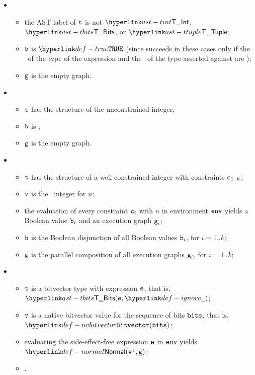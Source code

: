 \OneApplies
\begin{itemize}
  \item {}
  \begin{itemize}
    \item the AST label of $\texttt{t}$ is not $\TInt$, $\TBits$, or $\TTuple$;
    \item $\texttt{b}$ is $\True$ (since 
    succeeds in these cases only if the \structure\ of the type of the expression and the \structure\ of the type asserted against are \typeequivalent);
    \item $\texttt{g}$ is the empty graph.
  \end{itemize}

  \item {}
  \begin{itemize}
    \item $\texttt{t}$ has the structure of the unconstrained integer;
    \item $\texttt{b}$ is \True;
    \item $\texttt{g}$ is the empty graph.
  \end{itemize}

  \item {}
  \begin{itemize}
    \item $\texttt{t}$ has the structure of a well-constrained integer with constraints $\texttt{c}_{1..k}$;
    \item $\texttt{v}$ is the \nativevalue\  integer for $n$;
    \item the evaluation of every constraint $\texttt{c}_i$ with $n$ in environment $\texttt{env}$
    yields a Boolean value $\texttt{b}_i$ and an execution graph $\texttt{g}_i$\ProseOrError;
    \item $\texttt{b}$ is the Boolean disjunction of all Boolean values $\texttt{b}_i$, for $i=1..k$;
    \item $\texttt{g}$ is the parallel composition of all execution graphs $\texttt{g}_i$, for $i=1..k$;
  \end{itemize}

  \item {}
  \begin{itemize}
    \item $\texttt{t}$ is a bitvector type with expression $\texttt{e}$, that is, $\TBits(\ve, \Ignore)$;
    \item $\texttt{v}$ is a native bitvector value for the sequence of bits $\texttt{bits}$, that is, \\ $\nvbitvector(\vbits)$;
    \item evaluating the side-effect-free expression $\texttt{e}$ in $\texttt{env}$ yields $\Normal(\vvp, \vg)$\ProseOrError;
    \item {}.
  \end{itemize}


\end{itemize}
